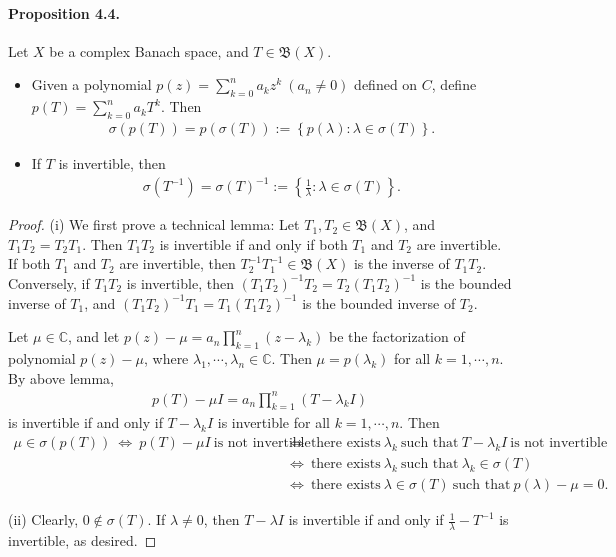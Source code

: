 \documentclass{article}
\begin{document}
\paragraph{Proposition 4.4.\label{prop:4.4}} Let $X$ be a complex Banach space, and $T\in\mathfrak{B}(X)$.
\begin{itemize}
	\vspace{0.1cm}
	\item[(i)] Given a polynomial $p(z)=\sum_{k=0}^n a_kz^k\ (a_n\neq 0)$ defined on $C$, define $p(T)=\sum_{k=0}^n a_k T^k$. Then 
	\begin{align*}
		\sigma(p(T))=p(\sigma(T)) := \left\{p(\lambda):\lambda\in\sigma(T)\right\}.
	\end{align*}
	\item[(ii)] If $T$ is invertible, then 
	\begin{align*}
		\sigma(T^{-1})=\sigma(T)^{-1} := \left\{\frac{1}{\lambda}:\lambda\in\sigma(T)\right\}.
	\end{align*}
\end{itemize}
\begin{proof}
(i) We first prove a technical lemma: Let $T_1,T_2\in\mathfrak{B}(X)$, and $T_1T_2=T_2T_1$. Then $T_1T_2$ is invertible if and only if both $T_1$ and $T_2$ are invertible. If both $T_1$ and $T_2$ are invertible, then $T_2^{-1}T_1^{-1}\in\mathfrak{B}(X)$ is the inverse of $T_1T_2$. Conversely, if $T_1T_2$ is invertible, then $(T_1T_2)^{-1}T_2 = T_2(T_1T_2)^{-1}$ is the bounded inverse of $T_1$, and $(T_1T_2)^{-1}T_1 = T_1(T_1T_2)^{-1}$ is the bounded inverse of $T_2$.\vspace{0.1cm}

Let $\mu\in\mathbb{C}$, and let $p(z) - \mu = a_n\prod_{k=1}^n(z-\lambda_k)$ be the factorization of polynomial $p(z)-\mu$, where $\lambda_1,\cdots,\lambda_n\in\mathbb{C}$. Then $\mu=p(\lambda_k)$ for all $k=1,\cdots, n$. By above lemma,
\begin{align*}
	p(T) - \mu I = a_n\prod_{k=1}^n (T-\lambda_k I)
\end{align*}
is invertible if and only if $T-\lambda_k I$ is invertible for all $k=1,\cdots,n$. Then
\begin{align*}
	\mu\in\sigma(p(T))\ \Leftrightarrow\ p(T)-\mu I\ \text{is not invertible}\ &\Leftrightarrow\ \text{there exists}\ \lambda_k\ \text{such that}\ T-\lambda_k I\ \text{is not invertible}\\
	&\Leftrightarrow\ \text{there exists}\ \lambda_k\ \text{such that}\ \lambda_k\in \sigma(T)\\
	&\Leftrightarrow\ \text{there exists}\ \lambda\in\sigma(T)\ \text{such that}\ p(\lambda)-\mu = 0.
\end{align*}

(ii) Clearly, $0\notin\sigma(T)$. If $\lambda\neq 0$, then $T-\lambda I$ is invertible if and only if $\frac{1}{\lambda} - T^{-1}$ is invertible, as desired.
\end{proof}
\end{document}
